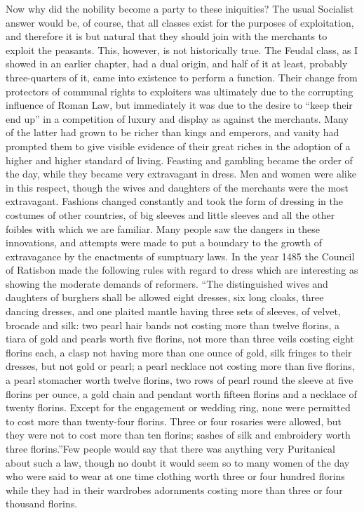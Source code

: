 \documentclass{book}
\begin{document}
Now why did the nobility become a party to these iniquities? The usual Socialist answer would be, of course, that all classes exist for the purposes of exploitation, and therefore it is but natural that they should join with the merchants to exploit the peasants. This, however, is not historically true. The Feudal class, as I showed in an earlier chapter, had a dual origin, and half of it at least, probably three-quarters of it, came into existence to perform a function. Their change from protectors of communal rights to exploiters was ultimately due to the corrupting influence of Roman Law, but immediately it was due to the desire to “keep their end up” in a competition of luxury and display as against the merchants. Many of the latter had grown to be richer than kings and emperors, and vanity had prompted them to give visible evidence of their great riches in the adoption of a higher and higher standard of living. Feasting and gambling became the order of the day, while they became very extravagant in dress. Men and women were alike in this respect, though the wives and daughters of the merchants were the most extravagant. Fashions changed constantly and took the form of dressing in the costumes of other countries, of big sleeves and little sleeves and all the other foibles with which we are familiar. Many people saw the dangers in these innovations, and attempts were made to put a boundary to the growth of extravagance by the enactments of sumptuary laws. In the year 1485 the Council of Ratisbon made the following rules with regard to dress which are interesting as showing the moderate demands of reformers. “The distinguished wives and daughters of burghers shall be allowed eight dresses, six long cloaks, three dancing dresses, and one plaited mantle having three sets of sleeves, of velvet, brocade and silk: two pearl hair bands not costing more than twelve florins, a tiara of gold and pearls worth five florins, not more than three veils costing eight florins each, a clasp not having more than one ounce of gold, silk fringes to their dresses, but not gold or pearl; a pearl necklace not costing more than five florins, a pearl stomacher worth twelve florins, two rows of pearl round the sleeve at five florins per ounce, a gold chain and pendant worth fifteen florins and a necklace of twenty florins. Except for the engagement or wedding ring, none were permitted to cost more than twenty-four florins. Three or four rosaries were allowed, but they were not to cost more than ten florins; sashes of silk and embroidery worth three florins.”\footnotemark[6] Few people would say that there was anything very Puritanical about such a law, though no doubt it would seem so to many women of the day who were said to wear at one time clothing worth three or four hundred florins while they had in their wardrobes adornments costing more than three or four thousand florins.
\end{document}
